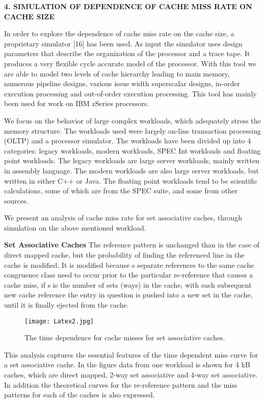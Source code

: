 \documentclass[14pt]{article}
\begin{document}
\begin{center}
\textbf{4. SIMULATION OF DEPENDENCE OF CACHE MISS RATE ON CACHE SIZE}
\end{center}

In order to explore the dependence of cache miss rate on the cache size, a proprietary simulator [16] has been used. As input the simulator uses design parameters that describe the organization of the processor and a trace tape. It produces a very flexible cycle accurate model of the processor. With this tool we are able to model two levels of cache hierarchy leading to main memory, numerous pipeline designs, various issue width superscalar designs, in-order execution processing and out-of-order execution processing. This tool has mainly been used for work on IBM zSeries processors.

We focus on the behavior of large complex workloads, which adequately stress the memory structure. The workloads used were largely on-line transaction processing (OLTP) and a processor simulator. The workloads have been divided up into 4 categories: legacy workloads, modern workloads, SPEC Int workloads and floating point workloads. The legacy workloads are large server workloads, mainly written in assembly language. The modern workloads are also large server workloads, but written in either C++ or Java. The floating point workloads tend to be scientific calculations, some of which are from the SPEC suite, and some from other sources. 

We present an analysis of cache miss rate for set associative caches, through simulation on the above mentioned workload. 

\textbf{Set Associative Caches}
The reference pattern is unchanged than in the case of direct mapped cache, but the probability of finding the referenced line in the cache is modified. It is modified because s separate references to the same cache congruence class need to occur prior to the particular re-reference that causes a cache miss, if s is the number of sets (ways) in the cache, with each subsequent new cache reference the entry in question is pushed into a new set in the cache, until it is finally ejected from the cache.
\begin{figure}[H]
\centering
\texttt{[image: Latex2.jpg]}
\caption{The time dependence for cache misses for set associative caches. }\label{visina8}
\end{figure}
This analysis captures the essential features of the time dependent miss curve for a set associative cache. In the figure data from one workload is shown for 4 kB caches, which are direct mapped, 2-way set associative and 4-way set associative. In addition the theoretical curves for the re-reference pattern and the miss patterns for each of the caches is also expressed.
\end{document}
